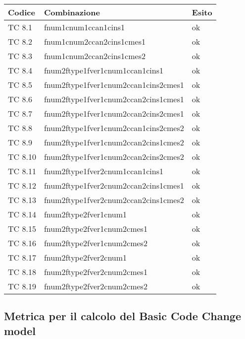 \begin{tabular}{|p{3cm}|p{7cm}|p{3cm}|}
	\hline
	\rowcolor{Gray}
	\textbf{Codice} & \textbf{Combinazione} & \textbf{Esito}\tabularnewline
	\hline
	TC 8.1			& fnum1cnum1ccan1cins1								& ok \tabularnewline
	\hline
	TC 8.2			& fnum1cnum2ccan2cins1cmes1							& ok \tabularnewline
	\hline
	TC 8.3			& fnum1cnum2ccan2cins1cmes2							& ok \tabularnewline
	\hline
	TC 8.4			& fnum2ftype1fver1cnum1ccan1cins1					& ok \tabularnewline
	\hline
	TC 8.5			& fnum2ftype1fver1cnum2ccan1cins2cmes1				& ok \tabularnewline
	\hline
	TC 8.6			& fnum2ftype1fver1cnum2ccan2cins1cmes1				& ok \tabularnewline
	\hline
	TC 8.7			& fnum2ftype1fver1cnum2ccan2cins2cmes1				& ok \tabularnewline
	\hline
	TC 8.8			& fnum2ftype1fver1cnum2ccan1cins2cmes2				& ok \tabularnewline
	\hline
	TC 8.9			& fnum2ftype1fver1cnum2ccan2cins1cmes2				& ok \tabularnewline
	\hline
	TC 8.10			& fnum2ftype1fver1cnum2ccan2cins2cmes2				& ok \tabularnewline
	\hline
	TC 8.11			& fnum2ftype1fver2cnum1ccan1cins1					& ok \tabularnewline
	\hline
	TC 8.12			& fnum2ftype1fver2cnum2ccan2cins1cmes1				& ok \tabularnewline
	\hline
	TC 8.13			& fnum2ftype1fver2cnum2ccan2cins1cmes2				& ok \tabularnewline
	\hline
	TC 8.14			& fnum2ftype2fver1cnum1								& ok \tabularnewline
	\hline
	TC 8.15			& fnum2ftype2fver1cnum2cmes1						& ok \tabularnewline
	\hline
	TC 8.16			& fnum2ftype2fver1cnum2cmes2						& ok \tabularnewline
	\hline
	TC 8.17			& fnum2ftype2fver2cnum1								& ok \tabularnewline
	\hline
	TC 8.18			& fnum2ftype2fver2cnum2cmes1						& ok \tabularnewline
	\hline
	TC 8.19			& fnum2ftype2fver2cnum2cmes2						& ok \tabularnewline
	\hline
\end{tabular}
\clearpage




\subsection{Metrica per il calcolo del Basic Code Change model}
		

